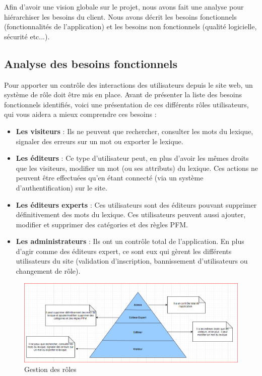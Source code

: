 \documentclass[12pt,a4paper]{article}
\begin{document}
Afin d'avoir une vision globale sur le projet, nous avons fait une analyse pour hiérarchiser les besoins du client.
Nous avons décrit les besoins fonctionnels (fonctionnalités de l'application) et les besoins non fonctionnels (qualité logicielle, sécurité etc...).

\subsection{Analyse des besoins fonctionnels}

Pour apporter un contrôle des interactions des utilisateurs depuis le site web, un système de rôle doit être mis en place. Avant de présenter la liste des besoins fonctionnels identifiés, voici une présentation de ces différents rôles utilisateurs, qui vous aidera a mieux comprendre ces besoins : 
\begin{itemize}  
  \item \textbf{Les visiteurs} : Ils ne peuvent que rechercher, consulter les mots du lexique, signaler des erreurs sur un mot ou exporter le lexique.
  \item \textbf{Les éditeurs} : Ce type d'utilisateur peut, en plus d'avoir les mêmes droits que les visiteurs, modifier un mot (ou ses attributs) du lexique. Ces actions ne peuvent être effectuées qu'en étant connecté (via un système d'authentification) sur le site.
  \item \textbf{Les éditeurs experts} : Ces utilisateurs sont des éditeurs pouvant supprimer définitivement des mots du lexique. Ces utilisateurs peuvent aussi ajouter, modifier et supprimer des catégories et des règles PFM.
  \item \textbf{Les administrateurs} : Ils ont un contrôle total de l'application. En plus d'agir comme des éditeurs expert, ce sont eux qui gèrent les différents utilisateurs du site (validation d'inscription, bannissement d'utilisateurs ou changement de rôle).
\end{itemize}

\smallbreak

\begin{figure}[h]
\centering
\includegraphics[width=150mm]{img/role.PNG}
\caption{Gestion des rôles}
\label{Tux}
\end{figure} 
\end{document}
